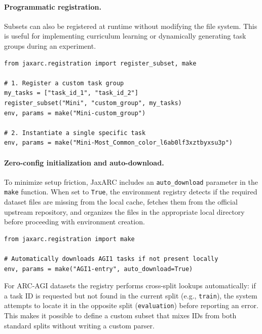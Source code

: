 \paragraph{Programmatic registration.}
Subsets can also be registered at runtime without modifying the file system. This is useful for implementing curriculum learning or dynamically generating task groups during an experiment.

\begin{lstlisting}[style=jaxarcpython, caption={Programmatic subset registration and single-task instantiation.}]
from jaxarc.registration import register_subset, make

# 1. Register a custom task group
my_tasks = ["task_id_1", "task_id_2"]
register_subset("Mini", "custom_group", my_tasks)
env, params = make("Mini-custom_group")

# 2. Instantiate a single specific task
env, params = make("Mini-Most_Common_color_l6ab0lf3xztbyxsu3p")
\end{lstlisting}

\paragraph{Zero-config initialization and auto-download.}
To minimize setup friction, JaxARC includes an \texttt{auto\_download} parameter in the \texttt{make} function. When set to \texttt{True}, the environment registry detects if the required dataset files are missing from the local cache, fetches them from the official upstream repository, and organizes the files in the appropriate local directory before proceeding with environment creation.

\begin{lstlisting}[style=jaxarcpython, caption={Zero-config instantiation with automatic dataset acquisition.}]
from jaxarc.registration import make

# Automatically downloads AGI1 tasks if not present locally
env, params = make("AGI1-entry", auto_download=True)
\end{lstlisting}

For ARC-AGI datasets the registry performs cross-split lookups automatically: if a task ID is requested but not found in the current split (e.g., \texttt{train}), the system attempts to locate it in the opposite split (\texttt{evaluation}) before reporting an error. This makes it possible to define a custom subset that mixes IDs from both standard splits without writing a custom parser.

